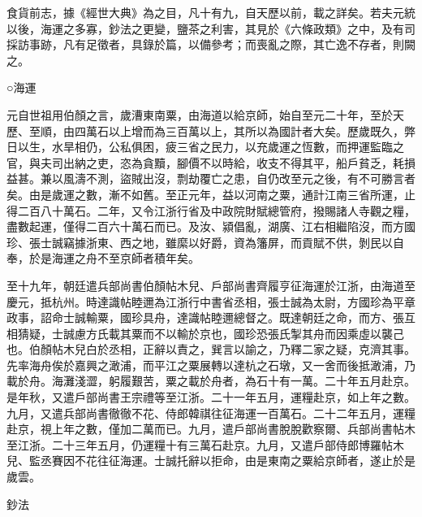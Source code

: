 
\begin{pinyinscope}

 食貨前志，據《經世大典》為之目，凡十有九，自天歷以前，載之詳矣。若夫元統以後，海運之多寡，鈔法之更變，鹽茶之利害，其見於《六條政類》之中，及有司採訪事跡，凡有足徵者，具錄於篇，以備參考；而喪亂之際，其亡逸不存者，則闕之。



 ○海運



 元自世祖用伯顏之言，歲漕東南粟，由海道以給京師，始自至元二十年，至於天歷、至順，由四萬石以上增而為三百萬以上，其所以為國計者大矣。歷歲既久，弊日以生，水旱相仍，公私俱困，疲三省之民力，以充歲運之恆數，而押運監臨之官，與夫司出納之吏，恣為貪黷，腳價不以時給，收支不得其平，船戶貧乏，耗損益甚。兼以風濤不測，盜賊出沒，剽劫覆亡之患，自仍改至元之後，有不可勝言者矣。由是歲運之數，漸不如舊。至正元年，益以河南之粟，通計江南三省所運，止得二百八十萬石。二年，又令江浙行省及中政院財賦總管府，撥賜諸人寺觀之糧，盡數起運，僅得二百六十萬石而已。及汝、潁倡亂，湖廣、江右相繼陷沒，而方國珍、張士誠竊據浙東、西之地，雖縻以好爵，資為籓屏，而貢賦不供，剝民以自奉，於是海運之舟不至京師者積年矣。



 至十九年，朝廷遣兵部尚書伯顏帖木兒、戶部尚書齊履亨征海運於江浙，由海道至慶元，抵杭州。時達識帖睦邇為江浙行中書省丞相，張士誠為太尉，方國珍為平章政事，詔命士誠輸粟，國珍具舟，達識帖睦邇總督之。既達朝廷之命，而方、張互相猜疑，士誠慮方氏載其粟而不以輸於京也，國珍恐張氏掣其舟而因乘虛以襲己也。伯顏帖木兒白於丞相，正辭以責之，巽言以諭之，乃釋二家之疑，克濟其事。先率海舟俟於嘉興之澉浦，而平江之粟展轉以達杭之石墩，又一舍而後抵澉浦，乃載於舟。海灘淺澀，躬履艱苦，粟之載於舟者，為石十有一萬。二十年五月赴京。是年秋，又遣戶部尚書王宗禮等至江浙。二十一年五月，運糧赴京，如上年之數。九月，又遣兵部尚書徹徹不花、侍郎韓祺往征海運一百萬石。二十二年五月，運糧赴京，視上年之數，僅加二萬而已。九月，遣戶部尚書脫脫歡察爾、兵部尚書帖木至江浙。二十三年五月，仍運糧十有三萬石赴京。九月，又遣戶部侍郎博羅帖木兒、監丞賽因不花往征海運。士誠托辭以拒命，由是東南之粟給京師者，遂止於是歲雲。



 鈔法




\end{pinyinscope}
